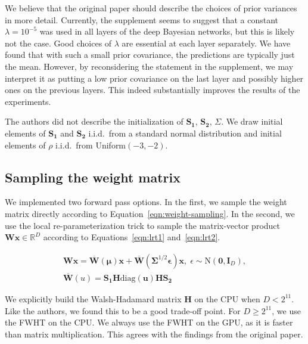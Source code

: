 We believe that the original paper should describe the choices of prior variances in more detail.
Currently, the supplement seems to suggest that a constant $\lambda = 10^{-5}$ was used in all layers of the deep Bayesian networks, but this is likely not the case.
Good choices of $\lambda$ are essential at each layer separately.
We have found that with such a small prior covariance, the predictions are typically just the mean.
However, by reconsidering the statement in the supplement, we may interpret it as putting a low prior covariance on the last layer and possibly higher ones on the previous layers.
This indeed substantially improves the results of the experiments.

The authors did not describe the initialization of $\mathbf{S_1}$, $\mathbf{S_2}$, $\Sigma$.
We draw initial elements of $\mathbf{S_1}$ and $\mathbf{S_2}$ i.i.d.\ from a standard normal distribution and initial elements of $\rho$ i.i.d.\ from Uniform$(-3, -2)$.

\subsection{Sampling the weight matrix}\label{subsec:sampling-the-weight-matrix}
We implemented two forward pass options.
In the first, we sample the weight matrix directly according to Equation~\ref{eqn:weight-sampling}.
In the second, we use the local re-parameterization trick to sample the matrix-vector product $\mathbf{W}\mathbf{x} \in \mathbb{R}^D$ according to Equations~\ref{eqn:lrt1} and~\ref{eqn:lrt2}.

\begin{align}
    \mathbf{W}\mathbf{x} = \overline{\mathbf{W}}(\mathbf{\mu})\mathbf{x} + \overline{\mathbf{W}}(\mathbf{\Sigma}^{1/2}\mathbf{\epsilon})\mathbf{x}, \; \epsilon \sim \mathrm{N}(\mathbf{0}, \mathbf{I}_D)\label{eqn:lrt1},\\
    \overline{\mathbf{W}}(u) = \mathbf{S_1} \mathbf{H} \mathrm{diag}(\mathbf{u}) \mathbf{H} \mathbf{S_2}\label{eqn:lrt2}
\end{align}

We explicitly build the Walsh-Hadamard matrix $\mathbf{H}$ on the CPU when $D < 2^{11}$.
Like the authors, we found this to be a good trade-off point.
For $D \ge 2^{11}$, we use the FWHT on the CPU\@.
We always use the FWHT on the GPU, as it is faster than matrix multiplication.
This agrees with the findings from the original paper.
